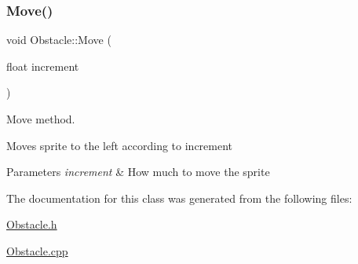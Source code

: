 \subsubsection{\texorpdfstring{Move()}{Move()}}
{\footnotesize\ttfamily void Obstacle\+::\+Move (\begin{DoxyParamCaption}\item[{float}]{increment }\end{DoxyParamCaption})}



Move method. 

Moves sprite to the left according to increment 
\begin{DoxyParams}{Parameters}
{\em increment} & How much to move the sprite \\
\hline
\end{DoxyParams}


The documentation for this class was generated from the following files\+:\begin{DoxyCompactItemize}
\item 
\mbox{\hyperlink{_obstacle_8h}{Obstacle.\+h}}\item 
\mbox{\hyperlink{_obstacle_8cpp}{Obstacle.\+cpp}}\end{DoxyCompactItemize}

